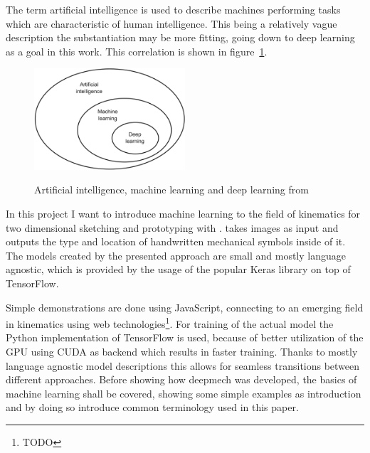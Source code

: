 The term artificial intelligence is used to describe machines performing tasks which are characteristic of human intelligence.
This being a relatively vague description the substantiation may be more fitting, going down to deep learning as a goal in this work.
This correlation is shown in figure~\ref{fig:ai_ml_dl}.

\begin{figure}
    \includegraphics[width=0.5\textwidth]{images/ai_ml_dl.png}
    \label{fig:ai_ml_dl}
    \caption{Artificial intelligence, machine learning and deep learning from \cite[p.4]{Chollet2017}}
\end{figure}

In this project I want to introduce machine learning to the field of kinematics for two dimensional sketching and prototyping with .
 takes images as input and outputs the type and location of
handwritten mechanical symbols inside of it. %
The models created by the presented approach are small and mostly language agnostic, which is provided by the usage of the popular Keras\cite{Chollet} library on top of TensorFlow\cite{Google}.

Simple demonstrations are done using JavaScript, connecting to an emerging field in kinematics using web technologies\footnote{ TODO }.
For training of the actual model the Python implementation of TensorFlow is used, because of better utilization of the GPU using CUDA\cite{nvidia2019} as backend which results in faster training.
Thanks to mostly language agnostic model descriptions this allows for seamless transitions between different approaches.
Before showing how deepmech was developed, the basics of machine learning shall be covered, showing some simple examples as introduction and by doing so introduce common terminology used in this paper.
